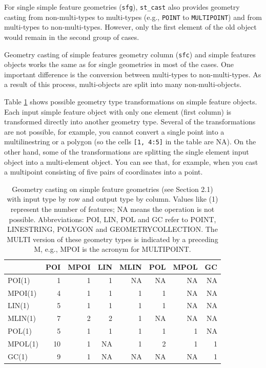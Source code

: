 \documentclass[]{krantz}
\let\BeginKnitrBlock\begin \let\EndKnitrBlock\end
\begin{document}
\BeginKnitrBlock{rmdnote}
For single simple feature geometries (\texttt{sfg}), \texttt{st\_cast} also provides geometry casting from non-multi-types to multi-types (e.g., \texttt{POINT} to \texttt{MULTIPOINT}) and from multi-types to non-multi-types.
However, only the first element of the old object would remain in the second group of cases.
\EndKnitrBlock{rmdnote}

Geometry casting of simple features geometry column (\texttt{sfc}) and simple features objects works the same as for single geometries in most of the cases.
One important difference is the conversion between multi-types to non-multi-types.
As a result of this process, multi-objects are split into many non-multi-objects.

Table \ref{tab:sfs-st-cast} shows possible geometry type transformations on simple feature objects.
Each input simple feature object with only one element (first column) is transformed directly into another geometry type.
Several of the transformations are not possible, for example, you cannot convert a single point into a multilinestring or a polygon (so the cells \texttt{{[}1,\ 4:5{]}} in the table are NA).
On the other hand, some of the transformations are splitting the single element input object into a multi-element object.
You can see that, for example, when you cast a multipoint consisting of five pairs of coordinates into a point.

\begin{table}[t]

\caption[Geometry casting on simple feature geometries.]{\label{tab:sfs-st-cast}Geometry casting on simple feature geometries (see Section 2.1) with input type by row and output type by column. Values like (1) represent the number of features; NA means the operation is not possible.
Abbreviations: POI, LIN, POL and GC refer to POINT, LINESTRING, POLYGON and GEOMETRYCOLLECTION. The MULTI version of these geometry types is indicated by a preceding M, e.g., MPOI is the acronym for MULTIPOINT.}
\centering
\begin{tabular}{lrrrrrrr}
\toprule
 & POI & MPOI & LIN & MLIN & POL & MPOL & GC\\
\midrule
POI(1) & 1 & 1 & 1 & NA & NA & NA & NA\\
MPOI(1) & 4 & 1 & 1 & 1 & 1 & NA & NA\\
LIN(1) & 5 & 1 & 1 & 1 & 1 & NA & NA\\
MLIN(1) & 7 & 2 & 2 & 1 & NA & NA & NA\\
POL(1) & 5 & 1 & 1 & 1 & 1 & 1 & NA\\
\addlinespace
MPOL(1) & 10 & 1 & NA & 1 & 2 & 1 & 1\\
GC(1) & 9 & 1 & NA & NA & NA & NA & 1\\
\bottomrule
\end{tabular}
\end{table}
\end{document}
